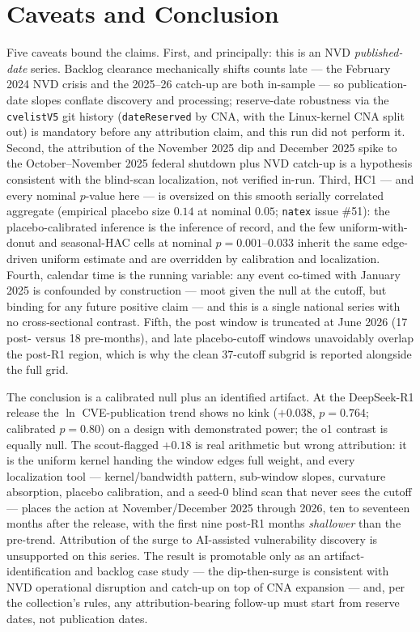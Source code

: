 \documentclass[11pt]{article}
\newcommand{\natex}{\texttt{natex}}
\begin{document}
\section{Caveats and Conclusion}\label{sec:conclusion}

Five caveats bound the claims. First, and principally: this is an NVD
\emph{published-date} series. Backlog clearance mechanically shifts counts
late --- the February 2024 NVD crisis and the 2025--26 catch-up are both
in-sample --- so publication-date slopes conflate discovery and processing;
reserve-date robustness via the \texttt{cvelistV5} git history
(\texttt{dateReserved} by CNA, with the Linux-kernel CNA split out) is
mandatory before any attribution claim, and this run did not perform it.
Second, the attribution of the November 2025 dip and December 2025 spike to
the October--November 2025 federal shutdown plus NVD catch-up is a
hypothesis consistent with the blind-scan localization, not verified
in-run. Third, HC1 --- and every nominal $p$-value here --- is oversized on
this smooth serially correlated aggregate (empirical placebo size $0.14$ at
nominal $0.05$; \natex{} issue \#51): the placebo-calibrated inference is
the inference of record, and the few uniform-with-donut and seasonal-HAC
cells at nominal $p=0.001$--$0.033$ inherit the same edge-driven uniform
estimate and are overridden by calibration and localization. Fourth,
calendar time is the running variable: any event co-timed with January 2025
is confounded by construction \cite{hausman2018} --- moot given the null at
the cutoff, but binding for any future positive claim --- and this is a
single national series with no cross-sectional contrast. Fifth, the post
window is truncated at June 2026 (17 post- versus 18 pre-months), and late
placebo-cutoff windows unavoidably overlap the post-R1 region, which is why
the clean 37-cutoff subgrid is reported alongside the full grid.

The conclusion is a calibrated null plus an identified artifact. At the
DeepSeek-R1 release the $\ln$ CVE-publication trend shows no kink
($+0.038$, $p=0.764$; calibrated $p=0.80$) on a design with demonstrated
power; the o1 contrast is equally null. The scout-flagged $+0.18$ is real
arithmetic but wrong attribution: it is the uniform kernel handing the
window edges full weight, and every localization tool --- kernel/bandwidth
pattern, sub-window slopes, curvature absorption, placebo calibration, and
a seed-0 blind scan that never sees the cutoff --- places the action at
November/December 2025 through 2026, ten to seventeen months after the
release, with the first nine post-R1 months \emph{shallower} than the
pre-trend. Attribution of the surge to AI-assisted vulnerability discovery
\cite{fang2024,deepseek2025} is unsupported on this series. The result is
promotable only as an artifact-identification and backlog case study ---
the dip-then-surge is consistent with NVD operational disruption and
catch-up on top of CNA expansion \cite{nist2026} --- and, per the
collection's rules, any attribution-bearing follow-up must start from
reserve dates, not publication dates.
\end{document}

